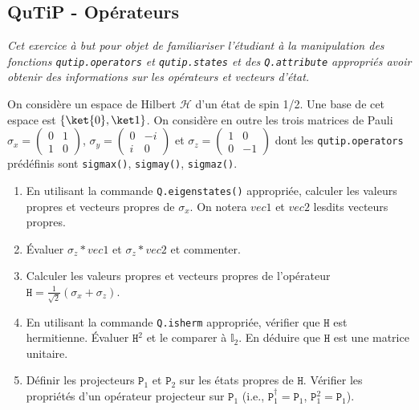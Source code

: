 \subsection{QuTiP - Opérateurs}

\emph{Cet exercice à but pour objet de familiariser l'étudiant à la manipulation 
des fonctions \texttt{qutip.operators} et \texttt{qutip.states} et des 
\texttt{Q.attribute} appropriés avoir obtenir des informations sur les 
opérateurs et vecteurs d'état.}

On considère un espace de Hilbert $\mathcal{H}$ d'un état de spin 1/2. Une base
de cet espace est $\{\ket{0},\ket1\}$. On considère en outre les trois matrices
de Pauli $\sigma_x = \begin{pmatrix}0 & 1 \\ 1 & 0 \end{pmatrix}$, $\sigma_y =
\begin{pmatrix}0 & -i \\ i & 0 \end{pmatrix}$ et
$\sigma_z = \begin{pmatrix}1 & 0 \\ 0 & -1 \end{pmatrix}$ dont les 
\texttt{qutip.operators} prédéfinis sont \texttt{sigmax()}, \texttt{sigmay()}, 
\texttt{sigmaz()}.

\begin{enumerate}
\item En utilisant la commande \texttt{Q.eigenstates()} appropriée, calculer les 
valeurs propres et vecteurs propres de $\sigma_x$. On notera $vec1$ et $vec2$ 
lesdits vecteurs propres.

\item Évaluer $\sigma_z*vec1$ et $\sigma_z*vec2$ et commenter.

\item Calculer les valeurs propres et vecteurs propres de l'opérateur
$\mathtt{H} = \frac{1}{\sqrt{2}} (\sigma_x+\sigma_z)$.

\item En utilisant  la commande \texttt{Q.isherm} appropriée, vérifier que 
$\mathtt{H}$ est hermitienne. Évaluer $\mathtt{H}^2$ et le comparer à 
$\mathbb{I}_2$. En déduire que $\mathtt{H}$ est une matrice unitaire.

\item Définir les projecteurs $\mathtt{P}_1$ et $\mathtt{P}_2$ sur les états
propres de $\mathtt{H}$. Vérifier les propriétés d'un opérateur projecteur sur
$\mathtt{P}_1$ (i.e., $\mathtt{P}_1^{\dag}=\mathtt{P}_1$,
$\mathtt{P}_1^2=\mathtt{P}_1$).
\end{enumerate}


